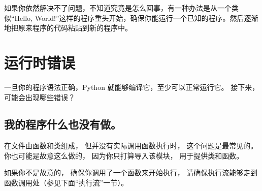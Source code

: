 
如果你依然解决不了问题，不知道究竟是怎么回事，有一种办法是从一个类似“Hello,
World!”这样的程序重头开始，确保你能运行一个已知的程序。然后逐渐地把原来程序的代码粘贴到新的程序中。

\section{运行时错误}


一旦你的程序语法正确，Python 就能够编译它，至少可以正常运行它。  
接下来，可能会出现哪些错误？

\subsection{我的程序什么也没有做。}


在文件由函数和类组成， 但并没有实际调用函数执行时， 这个问题是最常见的。  
你也可能是故意这么做的， 因为你只打算导入该模块， 用于提供类和函数。


如果你不是故意的， 确保你调用了一个函数来开始执行， 请确保执行流能够走到函数调用处（参见下面“执行流”一节）。  


